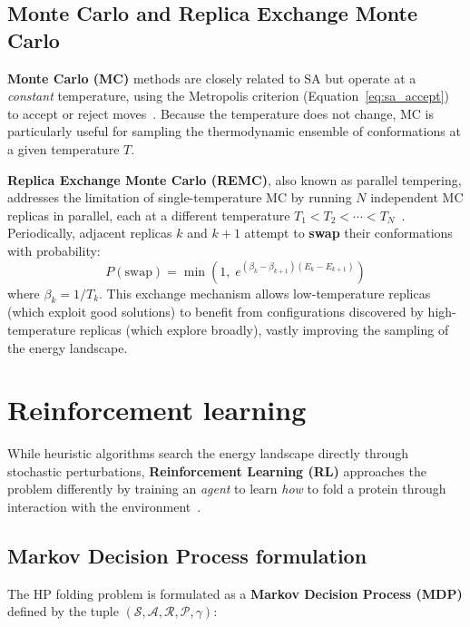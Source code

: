 \subsection{Monte Carlo and Replica Exchange Monte Carlo}
\label{cap2:subsec_mc}

\textbf{Monte Carlo (MC)} methods are closely related to SA but operate at a \textit{constant} temperature, using the Metropolis criterion (Equation~\ref{eq:sa_accept}) to accept or reject moves~\cite{metropolis1953equation}. Because the temperature does not change, MC is particularly useful for sampling the thermodynamic ensemble of conformations at a given temperature $T$.

\textbf{Replica Exchange Monte Carlo (REMC)}, also known as parallel tempering, addresses the limitation of single-temperature MC by running $N$ independent MC replicas in parallel, each at a different temperature $T_1 < T_2 < \cdots < T_N$~\cite{hukushima1996exchange,thachuk2007replica}. Periodically, adjacent replicas $k$ and $k+1$ attempt to \textbf{swap} their conformations with probability:
\begin{equation}
    P(\text{swap}) = \min\!\left(1,\; e^{(\beta_k - \beta_{k+1})(E_k - E_{k+1})}\right)
    \label{eq:remc_swap}
\end{equation}
where $\beta_k = 1/T_k$. This exchange mechanism allows low-temperature replicas (which exploit good solutions) to benefit from configurations discovered by high-temperature replicas (which explore broadly), vastly improving the sampling of the energy landscape.

\section{Reinforcement learning}
\label{cap2:sec_rl}

While heuristic algorithms search the energy landscape directly through stochastic perturbations, \textbf{Reinforcement Learning (RL)} approaches the problem differently by training an \textit{agent} to learn \textit{how} to fold a protein through interaction with the environment~\cite{sutton2018reinforcement}.

\subsection{Markov Decision Process formulation}
\label{cap2:subsec_mdp}

The HP folding problem is formulated as a \textbf{Markov Decision Process (MDP)} defined by the tuple $(\mathcal{S}, \mathcal{A}, \mathcal{R}, \mathcal{P}, \gamma)$:

